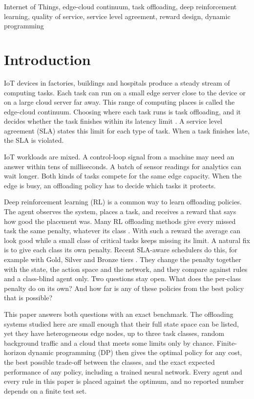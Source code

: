 \documentclass[journal]{IEEEtran}
\begin{document}
\begin{IEEEkeywords}
Internet of Things, edge-cloud continuum, task offloading, deep reinforcement learning, quality of service, service level agreement, reward design, dynamic programming
\end{IEEEkeywords}

\section{Introduction}
\label{sec:intro}

IoT devices in factories, buildings and hospitals produce a steady stream of computing tasks. Each task can run on a small edge server close to the device or on a large cloud server far away. This range of computing places is called the edge-cloud continuum. Choosing where each task runs is task offloading, and it decides whether the task finishes within its latency limit \cite{mao2017}. A service level agreement (SLA) states this limit for each type of task. When a task finishes late, the SLA is violated.

IoT workloads are mixed. A control-loop signal from a machine may need an answer within tens of milliseconds. A batch of sensor readings for analytics can wait longer. Both kinds of tasks compete for the same edge capacity. When the edge is busy, an offloading policy has to decide which tasks it protects.

Deep reinforcement learning (RL) \cite{mnih2015,sutton2018} is a common way to learn offloading policies. The agent observes the system, places a task, and receives a reward that says how good the placement was. Many RL offloading methods give every missed task the same penalty, whatever its class \cite{nieto2024}. With such a reward the average can look good while a small class of critical tasks keeps missing its limit. A natural fix is to give each class its own penalty. Recent SLA-aware schedulers do this, for example with Gold, Silver and Bronze tiers \cite{yamsani2026}. They change the penalty together with the state, the action space and the network, and they compare against rules and a class-blind agent only. Two questions stay open. What does the per-class penalty do on its own? And how far is any of these policies from the best policy that is possible?

This paper answers both questions with an exact benchmark. The offloading systems studied here are small enough that their full state space can be listed, yet they have heterogeneous edge nodes, up to three task classes, random background traffic and a cloud that meets some limits only by chance. Finite-horizon dynamic programming (DP) then gives the optimal policy for any cost, the best possible trade-off between the classes, and the exact expected performance of any policy, including a trained neural network. Every agent and every rule in this paper is placed against the optimum, and no reported number depends on a finite test set.
\end{document}
